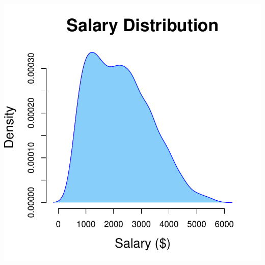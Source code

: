 \documentclass[aspectratio=169]{beamer}
\theoremstyle{principle}
\begin{document}
\begin{frame}
\begin{columns}
\begin{column}{0.5\textwidth}
\includegraphics[scale=0.5]{salary_distribution_fancy.pdf}
\end{column}

\end{columns}

\end{frame}
\end{document}
